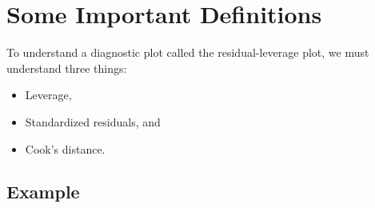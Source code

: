 \documentclass[residuals.tex]{subfiles}
\begin{document}
\newpage
\Large
\section{Some Important Definitions}

To understand a diagnostic plot called the residual-leverage plot, we must understand three things:

\begin{itemize}
	\item Leverage,
	\item Standardized residuals, and
	\item Cook's distance.
\end{itemize}




\subsection*{Example}
\end{document}
